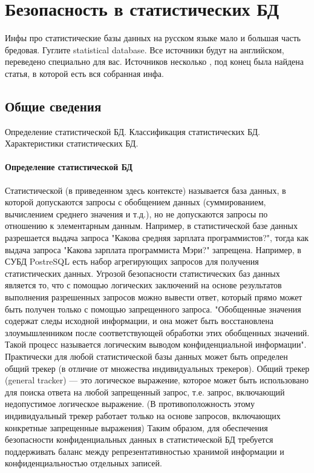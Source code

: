 \section{Безопасность в статистических БД}

Инфы про статистические базы данных на русском языке мало и большая часть бредовая. Гуглите statistical database. Все источники будут на английском, переведено специально для вас. Источников несколько \cite{ComputerSecurity2008} \cite{IntroBD2014}, под конец была найдена статья, \cite{SDB1989} в которой есть вся собранная инфа.

\subsection{Общие сведения}
Определение статистической БД. Классификация статистических БД. Характеристики статистических БД.

\paragraph{Определение статистической БД}
Статистической (в приведенном здесь контексте) называется база данных, в которой допускаются запросы с обобщением данных (суммированием, вычислением среднего значения и т.д.), но не допускаются запросы по отношению к элементарным данным. Например, в статистической базе данных разрешается выдача запроса "Какова средняя зарплата программистов?", тогда как выдача запроса "Какова зарплата программиста Мэри?" запрещена. Например, в СУБД PostreSQL есть набор агрегирующих запросов для получения статистических данных.
Угрозой безопасности статистических баз данных является то, что с помощью логических заключений на основе результатов выполнения разрешенных запросов можно вывести ответ, который прямо может быть получен только с помощью запрещенного запроса. "Обобщенные значения содержат следы исходной информации, и она может быть восстановлена злоумышленником после соответствующей обработки этих обобщенных значений. Такой процесс называется логическим выводом конфиденциальной информации".
Практически для любой статистической базы данных может быть определен общий трекер (в отличие от множества индивидуальных трекеров). Общий трекер (general tracker) — это логическое выражение, которое может быть использовано для поиска ответа на любой запрещенный запрос, т.е. запрос, включающий недопустимое логическое выражение. (В противоположность этому индивидуальный трекер работает только на основе запросов, включающих конкретные запрещенные выражения)
Таким образом, для обеспечения безопасности конфиденциальных данных в статистической БД требуется поддерживать баланс между репрезентативностью хранимой информации и конфиденциальностью отдельных записей.


